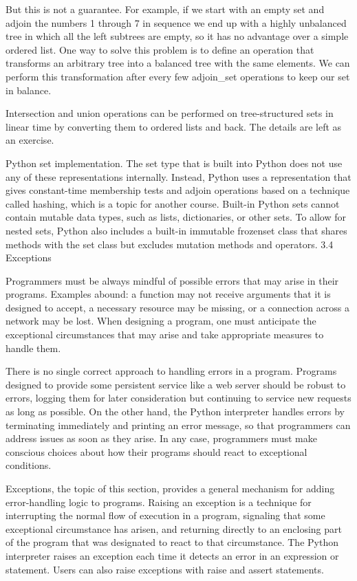\documentclass[letterpaper,10pt,dvipdfmx]{sphinxmanual}
\begin{document}
But this is not a guarantee. For example, if we start with an empty set and adjoin the numbers 1 through 7 in sequence we end up with a highly unbalanced tree in which all the left subtrees are empty, so it has no advantage over a simple ordered list. One way to solve this problem is to define an operation that transforms an arbitrary tree into a balanced tree with the same elements. We can perform this transformation after every few adjoin\_set operations to keep our set in balance.

Intersection and union operations can be performed on tree-structured sets in linear time by converting them to ordered lists and back. The details are left as an exercise.

Python set implementation. The set type that is built into Python does not use any of these representations internally. Instead, Python uses a representation that gives constant-time membership tests and adjoin operations based on a technique called hashing, which is a topic for another course. Built-in Python sets cannot contain mutable data types, such as lists, dictionaries, or other sets. To allow for nested sets, Python also includes a built-in immutable frozenset class that shares methods with the set class but excludes mutation methods and operators.
3.4   Exceptions

Programmers must be always mindful of possible errors that may arise in their programs. Examples abound: a function may not receive arguments that it is designed to accept, a necessary resource may be missing, or a connection across a network may be lost. When designing a program, one must anticipate the exceptional circumstances that may arise and take appropriate measures to handle them.

There is no single correct approach to handling errors in a program. Programs designed to provide some persistent service like a web server should be robust to errors, logging them for later consideration but continuing to service new requests as long as possible. On the other hand, the Python interpreter handles errors by terminating immediately and printing an error message, so that programmers can address issues as soon as they arise. In any case, programmers must make conscious choices about how their programs should react to exceptional conditions.

Exceptions, the topic of this section, provides a general mechanism for adding error-handling logic to programs. Raising an exception is a technique for interrupting the normal flow of execution in a program, signaling that some exceptional circumstance has arisen, and returning directly to an enclosing part of the program that was designated to react to that circumstance. The Python interpreter raises an exception each time it detects an error in an expression or statement. Users can also raise exceptions with raise and assert statements.
\end{document}
